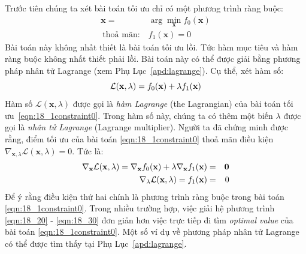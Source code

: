 Trước tiên chúng ta xét bài toán tối ưu chỉ có một phương trình ràng buộc:
\begin{equation}
\label{eqn:18_1constraint0}
\begin{aligned}
\mathbf{x}=& \arg\min_{\mathbf{x}} f_0(\mathbf{x}) \\\
\text{thoả mãn:}~& f_1(\mathbf{x}) = 0
\end{aligned}
\end{equation}
Bài toán này không nhất thiết là bài toán tối ưu lồi. Tức hàm mục tiêu
và hàm ràng buộc không nhất thiết phải lồi. Bài toán này có thể được giải bằng
phương pháp nhân tử Lagrange (xem Phụ Lục~\ref{apd:lagrange}). Cụ thể, xét hàm
số:
\begin{equation}
\label{eqn:simple_lagrange}
\mathcal{L}(\mathbf{x}, \lambda) = f_0(\mathbf{x}) + \lambda f_1(\mathbf{x})
\end{equation}
Hàm số
$\mathcal{L}(\mathbf{x}, \lambda)$ được gọi là \textit{hàm Lagrange}
(the Lagrangian) của bài toán tối ưu~\eqref{eqn:18_1constraint0}. Trong
hàm số này, chúng ta có thêm một biến  $\lambda$ được gọi là
\textit{nhân tử Lagrange} ({Lagrange multiplier}). Người ta đã chứng
minh được rằng, điểm tối ưu của bài toán
\eqref{eqn:18_1constraint0} thoả mãn điều kiện $\nabla_{\mathbf{x}, \lambda}
\mathcal{L}(\mathbf{x}, \lambda) = 0$. Tức là:
\begin{eqnarray}
\label{eqn:18_20}
\nabla_{\mathbf{x}} \mathcal{L}(\mathbf{x}, \lambda) = \nabla_{\mathbf{x}}f_0(\mathbf{x}) + \lambda \nabla_{\mathbf{x}} f_1(\mathbf{x}) &=& \mathbf{0} \\\
\label{eqn:18_30}
\nabla_{\lambda} \mathcal{L}(\mathbf{x}, \lambda) = f_1(\mathbf{x}) & = & 0
\end{eqnarray}
Để ý rằng điều kiện thứ hai chính là phương trình ràng buộc trong bài toán
\eqref{eqn:18_1constraint0}.
Trong nhiều
trường hợp, việc giải hệ phương trình \eqref{eqn:18_20} - \eqref{eqn:18_30} đơn giản hơn việc trực tiếp đi tìm \textit{optimal value} của bài
toán \eqref{eqn:18_1constraint0}. Một số ví dụ về phương pháp nhân tử Lagrange
có thể được tìm thấy tại Phụ Lục~\ref{apd:lagrange}.


